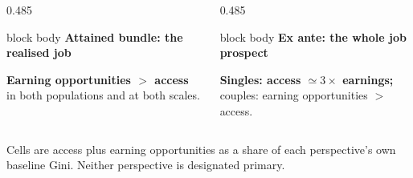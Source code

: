 \documentclass[10pt,aspectratio=169]{beamer}
\renewcommand{\caveat}[1]{{\fontsize{8.2}{10}\selectfont\raggedright\color{deepred}#1\par}}
\begin{document}
\begin{frame}
\vspace{0.2em}
\begin{columns}[T,onlytextwidth]
\begin{column}{0.485\textwidth}
\begin{beamercolorbox}[rounded=true,sep=0.8em]{block body}
{\bfseries Attained bundle: the realised job}\par\smallskip
{}
\smallskip
{\color{chearn}\bfseries Earning opportunities $>$ access}\\
in both populations and at both scales.
\end{beamercolorbox}
\end{column}
\begin{column}{0.485\textwidth}
\begin{beamercolorbox}[rounded=true,sep=0.8em]{block body}
{\bfseries Ex ante: the whole job prospect}\par\smallskip
{}
\smallskip
{\color{chacc}\bfseries Singles: access $\simeq 3\times$ earnings;}\\
couples: earning opportunities $>$ access.
\end{beamercolorbox}
\end{column}
\end{columns}
\vfill
\caveat{Cells are access plus earning opportunities as a share of each
perspective's own baseline Gini. Neither perspective is designated primary.}
\end{frame}
\end{document}
